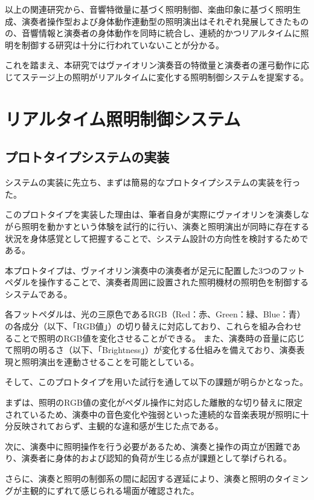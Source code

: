 以上の関連研究から、音響特徴量に基づく照明制御、楽曲印象に基づく照明生成、演奏者操作型および身体動作連動型の照明演出はそれぞれ発展してきたものの、音響情報と演奏者の身体動作を同時に統合し、連続的かつリアルタイムに照明を制御する研究は十分に行われていないことが分かる。

これを踏まえ、本研究ではヴァイオリン演奏音の特徴量と演奏者の運弓動作に応じてステージ上の照明がリアルタイムに変化する照明制御システムを提案する。


\section{リアルタイム照明制御システム} \label{sec:system}

\subsection{プロトタイプシステムの実装}

システムの実装に先立ち、まずは簡易的なプロトタイプシステムの実装を行った。

このプロトタイプを実装した理由は、筆者自身が実際にヴァイオリンを演奏しながら照明を動かすという体験を試行的に行い、演奏と照明演出が同時に存在する状況を身体感覚として把握することで、システム設計の方向性を検討するためである。

本プロトタイプは、ヴァイオリン演奏中の演奏者が足元に配置した3つのフットペダルを操作することで、演奏者周囲に設置された照明機材の照明色を制御するシステムである。

各フットペダルは、光の三原色であるRGB（Red：赤、Green：緑、Blue：青）の各成分（以下、「RGB値」）の切り替えに対応しており、これらを組み合わせることで照明のRGB値を変化させることができる。
また、演奏時の音量に応じて照明の明るさ（以下、「Brightness」）が変化する仕組みを備えており、演奏表現と照明演出を連動させることを可能としている。

そして、このプロトタイプを用いた試行を通して以下の課題が明らかとなった。

まずは、照明のRGB値の変化がペダル操作に対応した離散的な切り替えに限定されているため、演奏中の音色変化や強弱といった連続的な音楽表現が照明に十分反映されておらず、主観的な違和感が生じた点である。

次に、演奏中に照明操作を行う必要があるため、演奏と操作の両立が困難であり、演奏者に身体的および認知的負荷が生じる点が課題として挙げられる。

さらに、演奏と照明の制御系の間に起因する遅延により、演奏と照明のタイミングが主観的にずれて感じられる場面が確認された。


